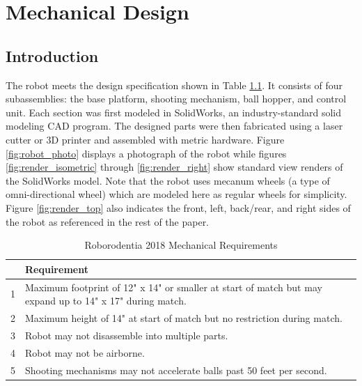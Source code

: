 \chapter{Mechanical Design}
\section{Introduction}
The robot meets the design specification shown in Table \ref{tab:roborodentia_reqs}. It consists of four subassemblies: the base platform, shooting mechanism, ball hopper, and control unit. Each section was first modeled in SolidWorks, an industry-standard solid modeling CAD program. The designed parts were then fabricated using a laser cutter or 3D printer and assembled with metric hardware. Figure \ref{fig:robot_photo} displays a photograph of the robot while figures \ref{fig:render_isometric} through \ref{fig:render_right} show standard view renders of the SolidWorks model. Note that the robot uses mecanum wheels (a type of omni-directional wheel) which are modeled here as regular wheels for simplicity. Figure \ref{fig:render_top} also indicates the front, left, back/rear, and right sides of the robot as referenced in the rest of the paper.

\begin{table}[h]
	\centering	\caption{Roborodentia 2018 Mechanical Requirements}
	\begin{tabular}{cp{5in}}
		\hline 
		& Requirement \\ 
		\hline 
		1 & \ssp Maximum footprint of 12" x 14" or smaller at start of match but may expand up to 14" x 17" during match. \\ 
		\hline 
		2 & \ssp Maximum height of 14" at start of match but no restriction during match. \\ 
		\hline 
		3 & Robot may not disassemble into multiple parts. \\ 
		\hline 
		4 & Robot may not be airborne. \\ 
		\hline 
		5 & Shooting mechanisms may not accelerate balls past 50 feet per second. \\ 
		\hline 
	\end{tabular} 
	\label{tab:roborodentia_reqs}
\end{table}

